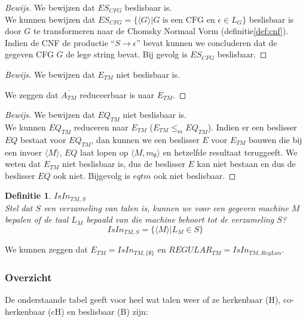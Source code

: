 \documentclass[a4paper]{article}
\newtheorem{tdefinitie}{Definitie}[section]
\newenvironment{definitie}[1]%
  {\begin{mdframed}[backgroundcolor=silver,
    topline=false,
    rightline=false,
    leftline=false,
    bottomline=false]\begin{tdefinitie}#1\\\normalfont}%
  {\end{tdefinitie}\end{mdframed}}
\newenvironment{bewijs}[1]%
  {\begin{mdframed}[topline=true,
    rightline=true,
    leftline=true,
    bottomline=true]\begin{proof}[Bewijs]#1\\[.2cm]\normalfont}%
  {\end{proof}\end{mdframed}}
\newcommand{\atm}{\ensuremath{{A_{TM}}}}
\newcommand{\etm}{\ensuremath{{E_{TM}}}}
\newcommand{\eqtm}{\ensuremath{{EQ_{TM}}}}
\begin{document}
\begin{bewijs}{We bewijzen dat $ES_{CFG}$ beslisbaar is.}
  We kunnen bewijzen dat $ES_{CFG} = \{\langle G \rangle | G \text{ is een CFG en } \epsilon \in L_G\}$ beslisbaar is door $G$ te transformeren naar de Chomsky Normaal Vorm (definitie\ref{def:cnf}). Indien de CNF de productie ``$S \rightarrow \epsilon$'' bevat kunnen we concluderen dat de gegeven CFG $G$ de lege string bevat. Bij gevolg is $ES_{CFG}$ beslisbaar.
\end{bewijs}


\begin{bewijs}{We bewijzen dat $\etm$ niet beslisbaar is.}
  
  
  We zeggen dat $\overline{\atm}$ reduceerbaar is naar $\etm$.
\end{bewijs}

\begin{bewijs}{We bewijzen dat $\eqtm$ niet beslisbaar is.}
  We kunnen $\eqtm$ reduceren naar $\etm$ ($\etm \leq_m \eqtm$). Indien er een beslisser $EQ$ bestaat voor $\eqtm$, dan kunnen we een beslisser $E$ voor $\etm$ bouwen die bij een invoer $\langle M \rangle$, $EQ$ laat lopen op $\langle M,m_\emptyset \rangle$ en hetzelfde resultaat teruggeeft. We weten dat $\etm$ niet beslisbaar is, dus de beslisser $E$ kan niet bestaan en dus de beslisser $EQ$ ook niet. Bijgevolg is $eqtm$ ook niet beslisbaar.
\end{bewijs}


\begin{definitie}{$IsIn_{TM,S}$}
  Stel dat $S$ een verzameling van talen is, kunnen we voor een gegeven machine $M$ bepalen of de taal $L_M$ bepaald van die machine behoort tot de verzameling $S$?
  \begin{equation*}
  IsIn_{TM,S} = \{\langle M \rangle|L_M \in S\}
  \end{equation*}
\end{definitie}

We kunnen zeggen dat $\etm = IsIn_{TM,\{\emptyset\}}$ en $REGULAR_{TM} = IsIn_{TM,RegLan}$.


\subsubsection{Overzicht}
De onderstaande tabel geeft voor heel wat talen weer of ze herkenbaar (H), co-herkenbaar (cH) en beslisbaar (B) zijn:
\end{document}
